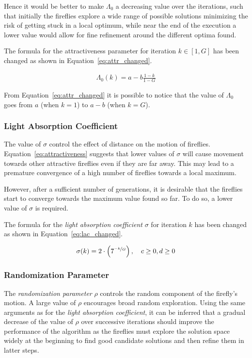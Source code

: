 Hence it would be better to make $\Lambda_0$ a decreasing value over the iterations, 
such that initially the fireflies explore a wide range of possible solutions
minimizing the risk of getting stuck in a local optimum, while 
near the end of the execution a lower value would allow for fine refinement
around the different optima found.

The formula for the attractiveness parameter for iteration
$k\in \left[1,G\right]$ has been changed as shown in Equation~\ref{eq:attr_changed}.

\begin{align}
\label{eq:attr_changed}
\Lambda_0(k) = a - b\frac{1-k}{1-G}
\end{align}

From Equation~\ref{eq:attr_changed} it is possible to notice
that the value of $\Lambda_0$ goes from $a$ (when $k=1$) to $a-b$ (when $k=G$).

\subsubsection{Light Absorption Coefficient}

The value of $\sigma$ control the effect of distance on the motion of fireflies.
Equation~\ref{eq:attractiveness} suggests that lower values of $\sigma$ will
cause movement towards other attractive fireflies even if they are far away.
This may lead to a premature convergence of a high number of fireflies
towards a local maximum.

However, after a sufficient number of generations, it is desirable
that the fireflies start to converge towards the maximum value found so far.
To do so, a lower value of $\sigma$ is required.

The formula for the \textit{light absorption coefficient} $\sigma$
for iteration $k$ has been changed as shown in Equation~\ref{eq:lac_changed}.

\begin{align}
\label{eq:lac_changed}
\sigma(k) = 2 \cdot \left(7^{\nicefrac{-k}{G}}\right),\quad c \ge 0, d \ge 0
\end{align}

\subsubsection{Randomization Parameter}

The \textit{randomization parameter} $\rho$ controls the random component
of the firefly's motion. A large value of $\rho$ encourages broad random exploration.
Using the same arguments as for the \textit{light absorption coefficient},
it can be inferred that a gradual decrease of the value of $\rho$ over
successive iterations should improve the performance of the algorithm
as the fireflies must explore the solution space widely at the beginning
to find good candidate solutions and then refine them in latter steps.

